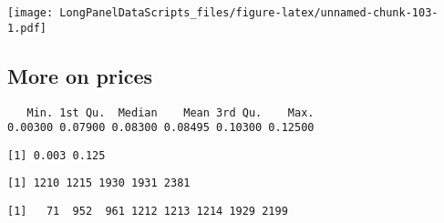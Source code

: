 \documentclass[]{book}
\newenvironment{Shaded}{\begin{snugshade}}{\end{snugshade}}
\newcommand{\KeywordTok}[1]{\textcolor[rgb]{0.13,0.29,0.53}{\textbf{#1}}}
\newcommand{\NormalTok}[1]{#1}
\newcommand{\OperatorTok}[1]{\textcolor[rgb]{0.81,0.36,0.00}{\textbf{#1}}}
\newcommand{\StringTok}[1]{\textcolor[rgb]{0.31,0.60,0.02}{#1}}
\begin{document}
\texttt{[image: LongPanelDataScripts\_files/figure-latex/unnamed-chunk-103-1.pdf]}

\hypertarget{more-on-prices}{%
\subsection{More on prices}\label{more-on-prices}}

\begin{Shaded}
\end{Shaded}

\begin{verbatim}
   Min. 1st Qu.  Median    Mean 3rd Qu.    Max. 
0.00300 0.07900 0.08300 0.08495 0.10300 0.12500 
\end{verbatim}

\begin{Shaded}
\end{Shaded}

\begin{verbatim}
[1] 0.003 0.125
\end{verbatim}

\begin{Shaded}
\end{Shaded}

\begin{verbatim}
[1] 1210 1215 1930 1931 2381
\end{verbatim}

\begin{Shaded}
\end{Shaded}

\begin{verbatim}
[1]   71  952  961 1212 1213 1214 1929 2199
\end{verbatim}
\end{document}
